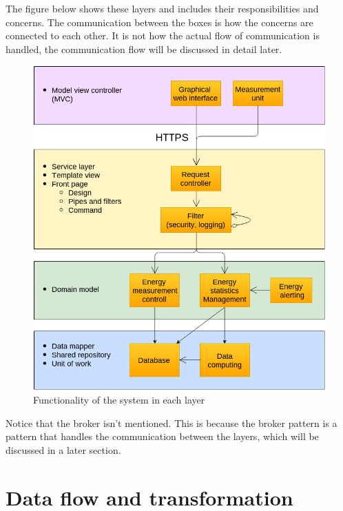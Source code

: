 The figure below shows these layers and includes their responsibilities and concerns. The communication between the boxes is how the concerns are connected to each other. It is not how the actual flow of communication is handled, the communication flow will be discussed in detail later.

\begin{figure}[H]
\centering
\includegraphics[scale=0.7]{7-software/images/layersflow.png}
\caption{Functionality of the system in each layer}
\label{fig:layersflow}
\end{figure}

Notice that the broker isn't mentioned. This is because the broker pattern is a pattern that handles the communication between the layers, which will be discussed in a later section.

\section{Data flow and transformation}

